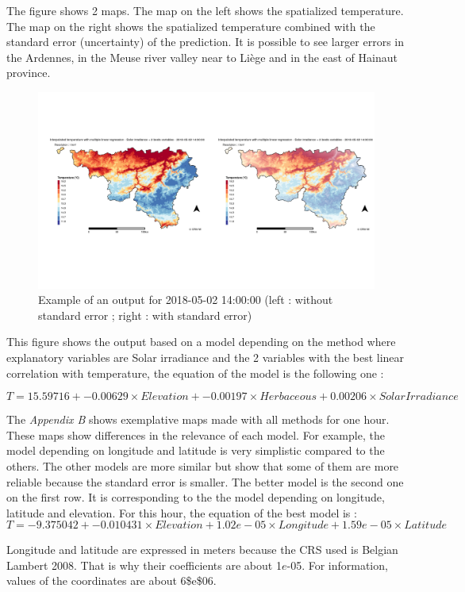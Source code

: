\documentclass[12pt,twoside]{reedthesis}
\theoremstyle{definition}
\theoremstyle{definition}
\theoremstyle{definition}
\theoremstyle{remark}
\begin{document}
The figure shows 2 maps. The map on the left shows the spatialized
temperature. The map on the right shows the spatialized temperature
combined with the standard error (uncertainty) of the prediction. It is
possible to see larger errors in the Ardennes, in the Meuse river valley
near to Liège and in the east of Hainaut province.
\begin{figure}
\includegraphics[width=1\linewidth]{figure/maperror} \caption{Example of an output for 2018-05-02 14:00:00 (left : without standard error ; right : with standard error)}\label{fig:map}
\end{figure}
This figure shows the output based on a model depending on the method
where explanatory variables are Solar irradiance and the 2 variables
with the best linear correlation with temperature, the equation of the
model is the following one :

\[
T = 15.59716 + -0.00629 \times Elevation + -0.00197 \times Herbaceous + 0.00206 \times SolarIrradiance
\]

The \emph{Appendix B} shows exemplative maps made with all methods for
one hour. These maps show differences in the relevance of each model.
For example, the model depending on longitude and latitude is very
simplistic compared to the others. The other models are more similar but
show that some of them are more reliable because the standard error is
smaller. The better model is the second one on the first row. It is
corresponding to the the model depending on longitude, latitude and
elevation. For this hour, the equation of the best model is : \[
T = -9.375042 + -0.010431 \times Elevation + 1.02e-05 \times Longitude + 1.59e-05 \times Latitude
\]

Longitude and latitude are expressed in meters because the CRS used is
Belgian Lambert 2008. That is why their coefficients are about
1\(e\)-05. For information, values of the coordinates are about
6\$e\$06.
\end{document}
